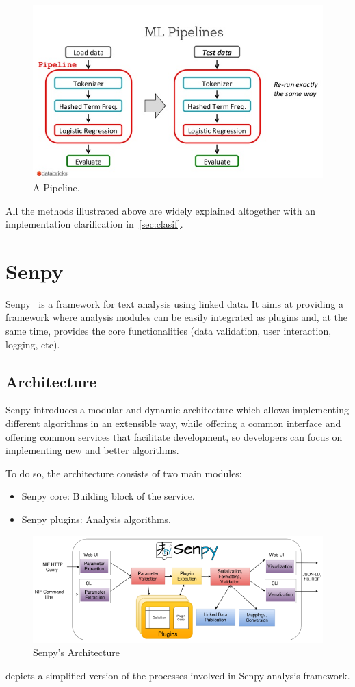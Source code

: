 \begin{figure}
	\includegraphics[width=\linewidth]{img/pipeline1.png}
	\caption{A Pipeline.~\cite{pipeline}}
	\label{fig:pipeline}
\end{figure}

All the methods illustrated above are widely explained altogether with an implementation clarification in~\cref{sec:clasif}.
\section{Senpy}
Senpy~\cite{senpy} is a framework for text analysis using linked data. It aims at providing a framework where analysis modules can be easily integrated as plugins and, at the same time, provides the core functionalities (data validation, user interaction, logging, etc).

\subsection{Architecture}
Senpy introduces a modular and dynamic architecture which allows implementing different algorithms in an extensible way, while offering a common interface and offering common services that facilitate development, so developers can focus on implementing new and better algorithms.\par
To do so, the architecture consists of two main modules:
\begin{itemize}
	\item Senpy core: Building block of the service.
	\item Senpy plugins: Analysis algorithms.
\end{itemize}
\begin{figure}
	\includegraphics[width=\linewidth]{img/senpy_architecture.png}
	\caption{Senpy's Architecture~\cite{senpy}}
	\label{fig:senpyarch}
\end{figure}
 depicts a simplified version of the processes involved in Senpy analysis framework.

